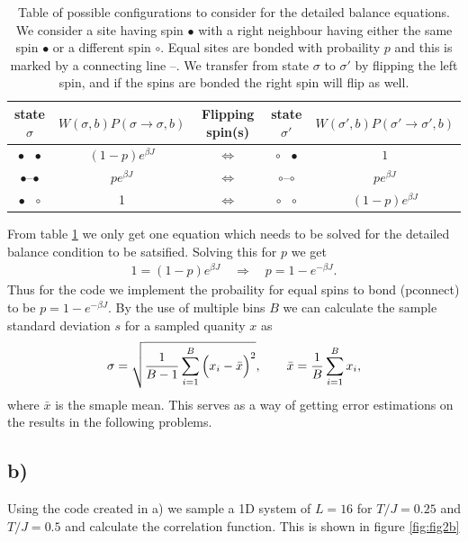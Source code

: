 \documentclass[reprint, amsmath, amssymb, aps, onecolumn]{revtex4-2}
\begin{document}
{\renewcommand{\arraystretch}{2}
\begin{table}[H]
  \begin{center}
  \caption{Table of possible configurations to consider for the detailed balance equations. We consider a site having spin $\bullet$ with a right neighbour having either the same spin $\bullet$ or a different spin $\circ$. Equal sites are bonded with probaility $p$ and this is marked by a connecting line --. We transfer from state $\sigma$ to $\sigma'$ by flipping the left spin, and if the spins are bonded the right spin will flip as well.}
  \begin{tabular}{|ccccc|} \hline
  \quad state $\sigma$\qquad &\qquad $W(\sigma,b)P(\sigma\to\sigma,b)$ \qquad  & Flipping spin(s) & \quad state $\sigma'$\qquad   &\qquad  $W(\sigma',b)P(\sigma'\to\sigma',b)$ \qquad \\ \hline
  $\bullet$ \ $\bullet$ & $(1-p)e^{\beta J}$ & $\Longleftrightarrow$ & $\circ$ \ $\bullet$ & $1$ \\ \hline
  $\bullet$--$\bullet$ & $pe^{\beta J}$ & $\Longleftrightarrow$ & $\circ$--$\circ$ & $pe^{\beta J}$ \\ \hline
  $\bullet$ \ $\circ$ & 1 & $\Longleftrightarrow$ & $\circ$ \ $\circ$ & $(1-p)e^{\beta J}$ \\ \hline
  \end{tabular}
  \label{tab:detailed_balance}
  \end{center}
\end{table}
{\renewcommand{\arraystretch}{1}
From table \ref{tab:detailed_balance} we only get one equation which needs to be solved for the detailed balance condition to be satsified. Solving this for $p$ we get 
\begin{align*}
  1 = (1-p)e^{\beta J} \quad \Rightarrow \quad p = 1 - e^{-\beta J}.
\end{align*}
Thus for the code we implement the probaility for equal spins to bond (pconnect) to be $p = 1 - e^{-\beta J}$. By the use of multiple bins $B$ we can calculate the sample standard deviation $s$ for a sampled quanity $x$ as
\begin{align*}
  \sigma = \sqrt{\frac{1}{B-1} \sum_{i=1}^B \Big(x_i - \Bar{x} \Big)^2}, \qquad \bar{x} = \frac{1}{B}\sum_{i=1}^B x_i,
\end{align*}
where $\bar{x}$ is the smaple mean. This serves as a way of getting error estimations on the results in the following problems.

\clearpage
\subsection*{b)}
\noindent Using the code created in a) we sample a 1D system of $L = 16$ for $T/J = 0.25$ and $T/J = 0.5$ and calculate the correlation function. This is shown in figure \ref{fig:fig2b}

}}
\end{document}
